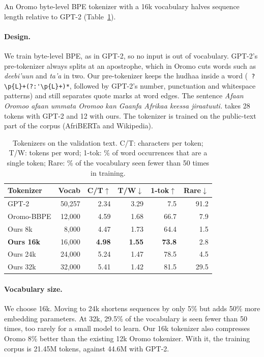 \documentclass[11pt]{article}
\newcommand{\om}[1]{\textit{#1}}
\begin{document}
An Oromo byte-level BPE tokenizer with a 16k vocabulary halves sequence length relative to GPT-2 (Table~\ref{tab:tok}).

\paragraph{Design.} We train byte-level BPE, as in GPT-2, so no input is out of vocabulary. GPT-2's pre-tokenizer always splits at an apostrophe, which in Oromo cuts words such as \om{deebi'uun} and \om{ta'a} in two. Our pre-tokenizer keeps the hudhaa inside a word (\verb| ?\p{L}+(?:'\p{L}+)*|, followed by GPT-2's number, punctuation and whitespace patterns) and still separates quote marks at word edges. The sentence \om{Afaan Oromoo afaan ummata Oromoo kan Gaanfa Afrikaa keessa jiraatuuti.} takes 28 tokens with GPT-2 and 12 with ours. The tokenizer is trained on the public-text part of the corpus (AfriBERTa and Wikipedia).

\begin{table}[t]
\centering
\small
\setlength{\tabcolsep}{4pt}
\begin{tabular}{@{}lrrrrr@{}}
\toprule
Tokenizer & Vocab & C/T$\uparrow$ & T/W$\downarrow$ & 1-tok$\uparrow$ & Rare$\downarrow$ \\
\midrule
GPT-2 & 50,257 & 2.34 & 3.29 & 7.5 & 91.2 \\
Oromo-BBPE & 12,000 & 4.59 & 1.68 & 66.7 & 7.9 \\
Ours 8k & 8,000 & 4.47 & 1.73 & 64.4 & 1.5 \\
\textbf{Ours 16k} & 16,000 & \textbf{4.98} & \textbf{1.55} & \textbf{73.8} & 2.8 \\
Ours 24k & 24,000 & 5.24 & 1.47 & 78.5 & 4.5 \\
Ours 32k & 32,000 & 5.41 & 1.42 & 81.5 & 29.5 \\
\bottomrule
\end{tabular}
\caption{Tokenizers on the validation text. C/T: characters per token; T/W: tokens per word; 1-tok: \% of word occurrences that are a single token; Rare: \% of the vocabulary seen fewer than 50 times in training.}
\label{tab:tok}
\end{table}

\paragraph{Vocabulary size.} We choose 16k. Moving to 24k shortens sequences by only 5\% but adds 50\% more embedding parameters. At 32k, 29.5\% of the vocabulary is seen fewer than 50 times, too rarely for a small model to learn. Our 16k tokenizer also compresses Oromo 8\% better than the existing 12k Oromo tokenizer. With it, the training corpus is 21.45M tokens, against 44.6M with GPT-2.
\end{document}
